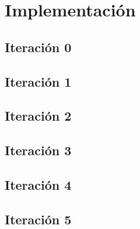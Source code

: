 \chapter{Implementación}\label{cap:implementacion}

\section{Iteración 0}

\section{Iteración 1}

\section{Iteración 2}

\section{Iteración 3}

\section{Iteración 4}

\section{Iteración 5}
